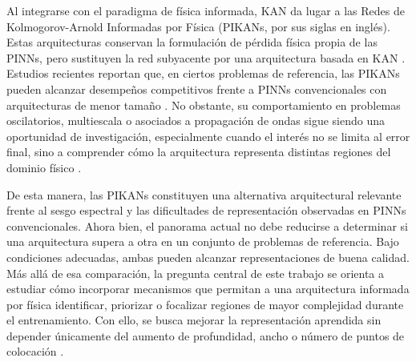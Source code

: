 Al integrarse con el paradigma de física informada, KAN da lugar a las Redes de Kolmogorov-Arnold Informadas por Física (PIKANs, por sus siglas en inglés). Estas arquitecturas conservan la formulación de pérdida física propia de las PINNs, pero sustituyen la red subyacente por una arquitectura basada en KAN \cite{toscano2025pikans}. Estudios recientes reportan que, en ciertos problemas de referencia, las PIKANs pueden alcanzar desempeños competitivos frente a PINNs convencionales con arquitecturas de menor tamaño \cite{shukla2024fair,wang2025kinn}. No obstante, su comportamiento en problemas oscilatorios, multiescala o asociados a propagación de ondas sigue siendo una oportunidad de investigación, especialmente cuando el interés no se limita al error final, sino a comprender cómo la arquitectura representa distintas regiones del dominio físico \cite{toscano2025pikans}.

De esta manera, las PIKANs constituyen una alternativa arquitectural relevante frente al sesgo espectral y las dificultades de representación observadas en PINNs convencionales. Ahora bien, el panorama actual no debe reducirse a determinar si una arquitectura supera a otra en un conjunto de problemas de referencia. Bajo condiciones adecuadas, ambas pueden alcanzar representaciones de buena calidad. Más allá de esa comparación, la pregunta central de este trabajo se orienta a estudiar cómo incorporar mecanismos que permitan a una arquitectura informada por física identificar, priorizar o focalizar regiones de mayor complejidad durante el entrenamiento. Con ello, se busca mejorar la representación aprendida sin depender únicamente del aumento de profundidad, ancho o número de puntos de colocación \cite{kharazmi2021hpvpinns,lu2021deepxde,shukla2024fair}.